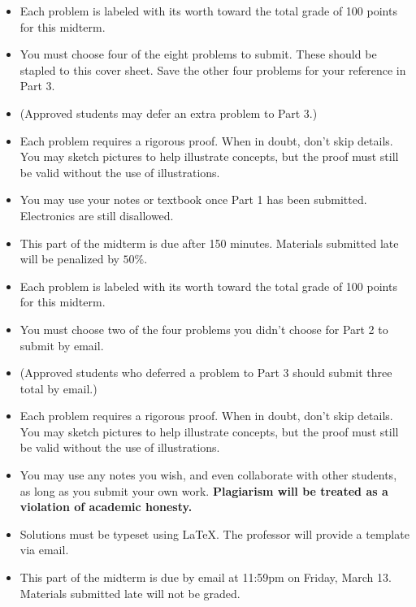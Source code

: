 \documentclass[12pt]{exam}
\newcommand{\<}{\langle}
\renewcommand{\>}{\rangle}
\begin{document}
\vspace{12pt}

\begin{itemize}
  \item Each problem is labeled with its worth toward the total grade
        of 100 points for this midterm.
  \item You must choose four of the eight problems to submit. These should
        be stapled to this cover sheet. Save the other four problems
        for your reference in Part 3.
  \item (Approved students may defer an extra problem to Part 3.)
  \item Each problem requires a rigorous proof. When in doubt, don't skip
        details. You may sketch pictures to help illustrate concepts, but
        the proof must still be valid without the use of illustrations.
  \item You may use your notes or textbook once Part 1 has been submitted.
        Electronics are still disallowed.
  \item This part of the midterm is due after 150 minutes. Materials submitted
        late will be penalized by \(50\%\).
\end{itemize}

\newpage

\newpage

\begin{center}
\end{center}
\vspace{0.1in}

\vspace{12pt}

\begin{itemize}
  \item Each problem is labeled with its worth toward the total grade
        of 100 points for this midterm.
  \item You must choose two of the four problems you didn't choose
        for Part 2 to submit by email.
  \item (Approved students who deferred a problem to Part 3 should submit
        three total by email.)
  \item Each problem requires a rigorous proof. When in doubt, don't skip
        details. You may sketch pictures to help illustrate concepts, but
        the proof must still be valid without the use of illustrations.
  \item You may use any notes you wish, and even collaborate with other
        students, as long as you submit your own work.
        \textbf{Plagiarism will be treated as a violation of academic honesty.}
  \item Solutions must be typeset using \LaTeX{}. The professor will
        provide a template via email.
  \item This part of the midterm is due by email at 11:59pm on Friday, March 13.
        Materials submitted late will not be graded.
\end{itemize}
\end{document}
